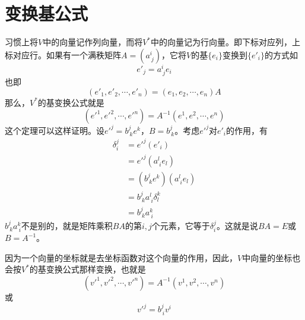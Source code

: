 \documentclass[a4paper,11pt]{ctexart}
\newcommand{\beq}{\begin{equation}}
\newcommand{\eeq}{\end{equation}}
\newcommand{\bea}{\begin{equation}\begin{aligned}}
\newcommand{\eea}{\end{aligned}\end{equation}}
\begin{document}
\section{变换基公式}
习惯上将$V$中的向量记作列向量，而将$V^*$中的向量记为行向量。即下标对应列，上标对应行。如果有一个满秩矩阵$A = (a^i_{\ j})$，它将$V$的基$\{e_i\}$变换到$\{e'_i\}$的方式如
\beq
e'_j = a^i_{\ j} e_i
\eeq
也即
\beq
(e'_1,e'_2,\cdots,e'_n) = (e_1,e_2,\cdots,e_n) A
\eeq
那么，$V^*$的基变换公式就是
\beq
(e'^1,e'^2,\cdots,e'^n) = A^{-1}(e^1,e^2,\cdots,e^n)
\eeq
这个定理可以这样证明。设$e'^j = b^j_{\ k} e^k$，$B= b^j_{\ k}$。考虑$e'^j$对$e'_i$的作用，有
\bea
\delta_i^j &=e'^j(e'_i) \\
 &= e'^j(a^l_{\ i} e_l) \\
&=(b^j_{\ k} e^k)(a^l_{\ i} e_l) \\
&=b^j_{\ k} a^l_{\ i} \delta_l^k \\
&= b^j_{\ k} a^k_{\ i}
\eea
$b^j_{\ k} a^k_{\ i}$不是别的，就是矩阵乘积$BA$的第$i,j$个元素，它等于$\delta_i^j$。这就是说$BA= E$或$B = A^{-1}$。
\par
因为一个向量的坐标就是去坐标函数对这个向量的作用，因此，$V$中向量的坐标也会按$V^*$的基变换公式那样变换，也就是
\beq
(v'^1,v'^2,\cdots,v'^n) = A^{-1}(v^1,v^2,\cdots,v^n)
\eeq
或
\beq
v'^j = b^j_{\ i} v^i
\eeq
\end{document}

